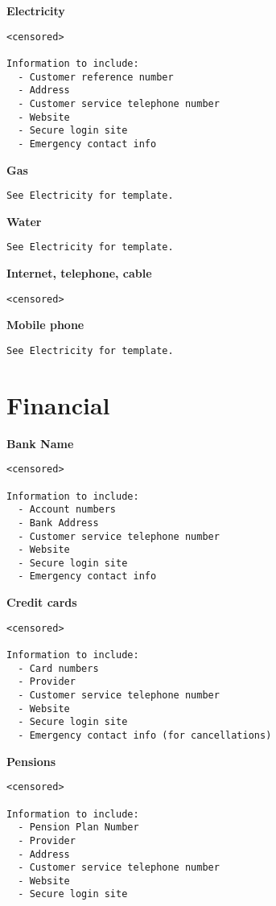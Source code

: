 \documentclass[]{book}
\theoremstyle{definition}
\theoremstyle{definition}
\theoremstyle{definition}
\theoremstyle{remark}
\begin{document}
\textbf{Electricity}

\begin{verbatim}
<censored>

Information to include:
  - Customer reference number
  - Address
  - Customer service telephone number
  - Website
  - Secure login site
  - Emergency contact info
\end{verbatim}

\textbf{Gas}

\begin{verbatim}
See Electricity for template.
\end{verbatim}

\textbf{Water}

\begin{verbatim}
See Electricity for template.
\end{verbatim}

\textbf{Internet, telephone, cable}

\begin{verbatim}
<censored>
\end{verbatim}

\textbf{Mobile phone}

\begin{verbatim}
See Electricity for template.
\end{verbatim}

\section{Financial}\label{financial}

\textbf{Bank Name}

\begin{verbatim}
<censored>

Information to include:
  - Account numbers
  - Bank Address
  - Customer service telephone number
  - Website
  - Secure login site
  - Emergency contact info
\end{verbatim}

\textbf{Credit cards}

\begin{verbatim}
<censored>

Information to include:
  - Card numbers
  - Provider
  - Customer service telephone number
  - Website
  - Secure login site
  - Emergency contact info (for cancellations)
\end{verbatim}

\textbf{Pensions}

\begin{verbatim}
<censored>

Information to include:
  - Pension Plan Number
  - Provider
  - Address
  - Customer service telephone number
  - Website
  - Secure login site
\end{verbatim}
\end{document}
